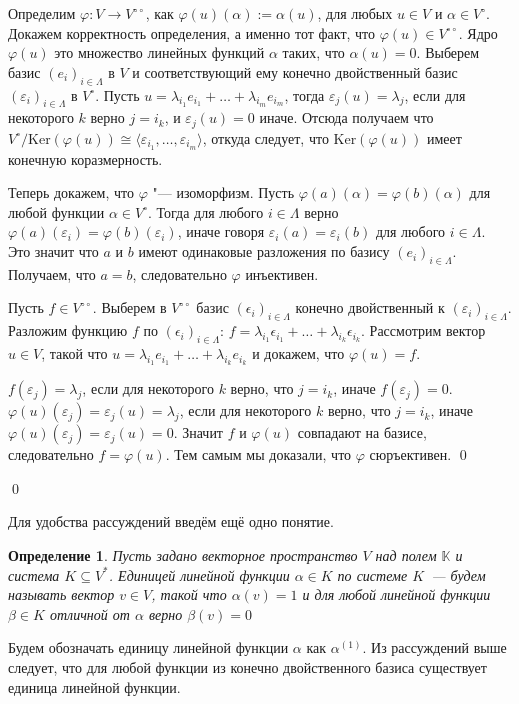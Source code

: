 \documentclass[12pt, reqno, a4paper, oneside, notitlepage]{amsart}
\makeatletter
\theoremstyle{mytheoremstyle}
\theoremstyle{myremarkstyle}
\newtheorem{definition}[theorem]{Определение}
\numberwithin{equation}{section}
\renewenvironment{proof}[1][\proofname]{\par\indent {\bfseries #1\@addpunct{.} }}{\qed}
\makeatother
\begin{document}
\begin{proof}
    Определим $\varphi: V \to V^{\circ\circ}$, как $\varphi(u)(\alpha):= \alpha(u)$, для любых $u \in V$ и $\alpha \in V^\circ$. 
    Докажем корректность определения, а именно тот факт, что $\varphi(u) \in V^{\circ\circ}$.
    Ядро $\varphi(u)$ это множество линейных функций $\alpha$ таких, что $\alpha(u) = 0$.
    Выберем базис $(e_i)_{i \in \Lambda}$ в $V$ и соответствующий ему конечно двойственный базис $(\varepsilon_i)_{i \in \Lambda}$ в $V^\circ$. Пусть $u = \lambda_{i_1}e_{i_1}+ \dots +\lambda_{i_m}e_{i_m}$, тогда $\varepsilon_j(u) = \lambda_j$, если для некоторого $k$ верно $j=i_k$, и 
    $\varepsilon_j(u)= 0$ иначе. Отсюда получаем что $V^\circ/\mathrm{Ker}(\varphi(u)) \cong \langle\varepsilon_{i_1}, \dots , \varepsilon_{i_m} \rangle$, откуда следует, что $\mathrm{Ker}(\varphi(u))$ имеет конечную коразмерность.

    Теперь докажем, что $\varphi$ "--- изоморфизм.
    Пусть $\varphi(a)(\alpha) = \varphi(b)(\alpha)$ для любой функции $\alpha \in V^\circ$. 
    Тогда для любого $i \in \Lambda$ верно $\varphi(a)(\varepsilon_i)= \varphi(b)(\varepsilon_i)$, иначе говоря $\varepsilon_i(a) = \varepsilon_i(b)$ для любого  $i \in \Lambda$. Это значит что $a$ и $b$ имеют одинаковые разложения по базису $(e_i)_{i \in \Lambda}$. Получаем, что $a = b$, следовательно $\varphi$ инъективен.

    Пусть $f \in V^{\circ\circ}$. Выберем в $V^{\circ\circ}$ базис $(\epsilon_i)_{i \in \Lambda}$ конечно двойственный к $(\varepsilon_i)_{i \in \Lambda}$. 
    Разложим функцию $f$ по $(\epsilon_i)_{i \in \Lambda}$: $f = \lambda_{i_1}\epsilon_{i_1} + \dots + \lambda_{i_k}\epsilon_{i_k}$. 
    Рассмотрим вектор $u \in V$, такой что $u = \lambda_{i_1}e_{i_1} + \dots + \lambda_{i_k}e_{i_k}$ и докажем, что $\varphi(u) = f$.
    
    $f(\varepsilon_j) = \lambda_j$, если для некоторого $k$ верно, что $j = i_k$, иначе $f(\varepsilon_j) = 0$. $\varphi(u)(\varepsilon_j) = \varepsilon_j(u) = \lambda_j$, если для некоторого $k$ верно, что $j = i_k$, иначе $\varphi(u)(\varepsilon_j) = \varepsilon_j(u) = 0$.
    Значит $f$ и $\varphi(u)$ совпадают на базисе, следовательно $f = \varphi(u)$. Тем самым мы доказали, что $\varphi$ сюръективен. \qed
    
\end{proof}

Для удобства рассуждений введём ещё одно понятие.

\begin{definition}

Пусть задано векторное пространство $V$ над полем $\mathbb{K}$ и система $K \subseteq V^*$.
Единицей линейной функции $\alpha \in K$ по системе $K$~--- будем называть вектор $v\in V$, такой что $\alpha(v) = 1$ и для любой линейной функции $\beta \in K$ отличной от $\alpha$ верно $\beta(v) = 0$
\end{definition}
Будем обозначать единицу линейной функции $\alpha$ как $\alpha^{(1)}$.
Из рассуждений выше следует, что для любой функции из конечно двойственного базиса существует единица линейной функции.
\end{document}
